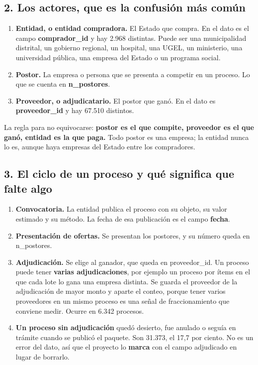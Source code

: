 \documentclass[11pt]{article}
\begin{document}
\subsection*{2. Los actores, que es la confusión más común}
\begin{enumerate}
  \item \textbf{Entidad, o entidad compradora.} El Estado que compra. En el dato es el campo \textbf{comprador\_\allowbreak{}id} y hay 2.968 distintas. Puede ser una municipalidad distrital, un gobierno regional, un hospital, una UGEL, un ministerio, una universidad pública, una empresa del Estado o un programa social.
  \item \textbf{Postor.} La empresa o persona que se presenta a competir en un proceso. Lo que se cuenta en \textbf{n\_\allowbreak{}postores}.
  \item \textbf{Proveedor, o adjudicatario.} El postor que ganó. En el dato es \textbf{proveedor\_\allowbreak{}id} y hay 67.510 distintos.
\end{enumerate}
La regla para no equivocarse: \textbf{postor es el que compite, proveedor es el que ganó, entidad es la que paga.} Todo postor es una empresa; la entidad nunca lo es, aunque haya empresas del Estado entre los compradores.

\subsection*{3. El ciclo de un proceso y qué significa que falte algo}
\begin{enumerate}
  \item \textbf{Convocatoria.} La entidad publica el proceso con su objeto, su valor estimado y su método. La fecha de esa publicación es el campo \textbf{fecha}.
  \item \textbf{Presentación de ofertas.} Se presentan los postores, y su número queda en n\_\allowbreak{}postores.
  \item \textbf{Adjudicación.} Se elige al ganador, que queda en proveedor\_\allowbreak{}id. Un proceso puede tener \textbf{varias adjudicaciones}, por ejemplo un proceso por ítems en el que cada lote lo gana una empresa distinta. Se guarda el proveedor de la adjudicación de mayor monto y aparte el conteo, porque tener varios proveedores en un mismo proceso es una señal de fraccionamiento que conviene medir. Ocurre en 6.342 procesos.
  \item \textbf{Un proceso sin adjudicación} quedó desierto, fue anulado o seguía en trámite cuando se publicó el paquete. Son 31.373, el 17,7 por ciento. No es un error del dato, así que el proyecto lo \textbf{marca} con el campo adjudicado en lugar de borrarlo.
\end{enumerate}
\end{document}
